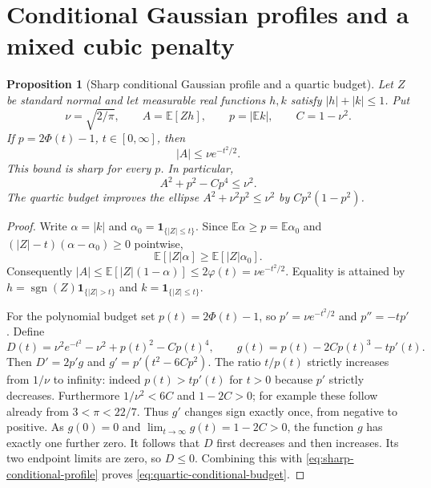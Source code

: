 \documentclass[11pt]{article}
\newtheorem{proposition}[theorem]{Proposition}
\begin{document}
\section{Conditional Gaussian profiles and a mixed cubic penalty}\label{sec:mixed}
\begin{proposition}[Sharp conditional Gaussian profile and a quartic budget]
\label{prop:conditional-gaussian-budget}
Let $Z$ be standard normal and let measurable real functions $h,k$ satisfy
$|h|+|k|\leq1$.  Put
\[
 \nu=\sqrt{2/\pi},\qquad A=\mathbb E[Zh],\qquad
 p=|\mathbb E k|,\qquad C=1-\nu^2.
\]
If $p=2\Phi(t)-1$, $t\in[0,\infty]$, then
\begin{equation}\label{eq:sharp-conditional-profile}
 |A|\leq\nu e^{-t^2/2}.
\end{equation}
This bound is sharp for every $p$.  In particular,
\begin{equation}\label{eq:quartic-conditional-budget}
 A^2+p^2-Cp^4\leq\nu^2.
\end{equation}
The quartic budget improves the ellipse
$A^2+\nu^2p^2\leq\nu^2$ by $Cp^2(1-p^2)$.
\end{proposition}

\begin{proof}
Write $\alpha=|k|$ and $\alpha_0=\mathbf1_{\{|Z|\leq t\}}$.
Since $\mathbb E\alpha\geq p=\mathbb E\alpha_0$ and
$(|Z|-t)(\alpha-\alpha_0)\geq0$ pointwise,
\[
 \mathbb E[|Z|\alpha]\geq\mathbb E[|Z|\alpha_0].
\]
Consequently $|A|\leq\mathbb E[|Z|(1-\alpha)]\leq2\varphi(t)
=\nu e^{-t^2/2}$.  Equality is attained by
$h=\operatorname{sgn}(Z)\mathbf1_{\{|Z|>t\}}$ and
$k=\mathbf1_{\{|Z|\leq t\}}$.

For the polynomial budget set $p(t)=2\Phi(t)-1$, so
$p'=\nu e^{-t^2/2}$ and $p''=-tp'$.  Define
\[
 D(t)=\nu^2e^{-t^2}-\nu^2+p(t)^2-Cp(t)^4,
 \qquad g(t)=p(t)-2Cp(t)^3-tp'(t).
\]
Then $D'=2p'g$ and $g'=p'(t^2-6Cp^2)$.
The ratio $t/p(t)$ strictly increases from $1/\nu$ to infinity:
indeed $p(t)>tp'(t)$ for $t>0$ because $p'$ strictly decreases.
Furthermore $1/\nu^2<6C$ and $1-2C>0$; for example these follow
already from $3<\pi<22/7$.
Thus $g'$ changes sign exactly once, from negative to positive.
As $g(0)=0$ and $\lim_{t\to\infty}g(t)=1-2C>0$, the function $g$
has exactly one further zero.  It follows that $D$ first decreases
and then increases.  Its two endpoint limits are zero, so $D\leq0$.
Combining this with \eqref{eq:sharp-conditional-profile} proves
\eqref{eq:quartic-conditional-budget}.
\end{proof}
\end{document}
